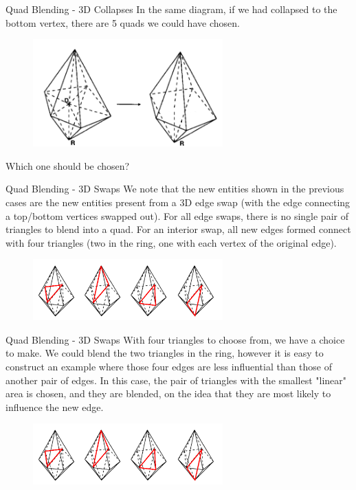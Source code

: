 \documentclass[12pt]{beamer}
\newcommand{\spa}{\vspace{0.5cm}\newline}
\begin{document}
\begin{frame}{Quad Blending - 3D Collapses}
In the same diagram, if we had collapsed to the bottom vertex, there are 5 quads we could have chosen.
\begin{figure}
  \centering
  \includegraphics[width=0.65\textwidth]{bezier_images/edgeCollapse2.png} 
\end{figure}
Which one should be chosen?
\end{frame}
\begin{frame}{Quad Blending - 3D Swaps}
We note that the new entities shown in the previous cases are the new entities present from a 3D edge swap (with the edge connecting a top/bottom vertices swapped out). \spa For all edge swaps, there is no single pair of triangles to blend into a quad. For an interior swap, all new edges formed connect with four triangles (two in the ring, one with each vertex of the original edge).
\begin{figure}
  \centering
  \includegraphics[width=0.65\textwidth]{bezier_images/edgeSwap.png} 
\end{figure}
\end{frame}
\begin{frame}{Quad Blending - 3D Swaps}
With four triangles to choose from, we have a choice to make. We could blend the two triangles in the ring, however it is easy to construct an example where those four edges are less influential than those of another pair of edges. In this case, the pair of triangles with the smallest "linear" area is chosen, and they are blended, on the idea that they are most likely to influence the new edge.
\begin{figure}
  \centering
  \includegraphics[width=0.65\textwidth]{bezier_images/edgeSwap.png} 
\end{figure}
\end{frame}
\end{document}
